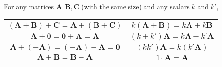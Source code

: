 \documentclass[../setup.tex]{subfiles}
\begin{document}
\begin{theorem}
For any matrices $\bm{A}, \bm{B}, \bm{C}$ (with the same size) and any scalars $k$ and $k'$,
\begin{center}
\begin{tabular}[t]{| c | c |}
\hline
	$\left(\bm{A} + \bm{B}\right) + \bm{C} = \bm{A} + \left(\bm{B} + \bm{C}\right)$ & $k\left(\bm{A} + \bm{B}\right) = k\bm{A} + k\bm{B}$ \\
\hline
	$\bm{A} + \bm{0} = \bm{0} + \bm{A} = \bm{A}$ & $(k + k')\bm{A} = k\bm{A} + k'\bm{A}$ \\
\hline
	$\bm{A} + (-\bm{A}) = (-\bm{A}) + \bm{A} = \bm{0}$ & $(kk')\bm{A} = k(k'\bm{A})$ \\
\hline
	$\bm{A} + \bm{B} = \bm{B} + \bm{A}$ & $1 \cdot \bm{A} = \bm{A}$ \\
\hline
\end{tabular}
\end{center}
\end{theorem}
\end{document}

